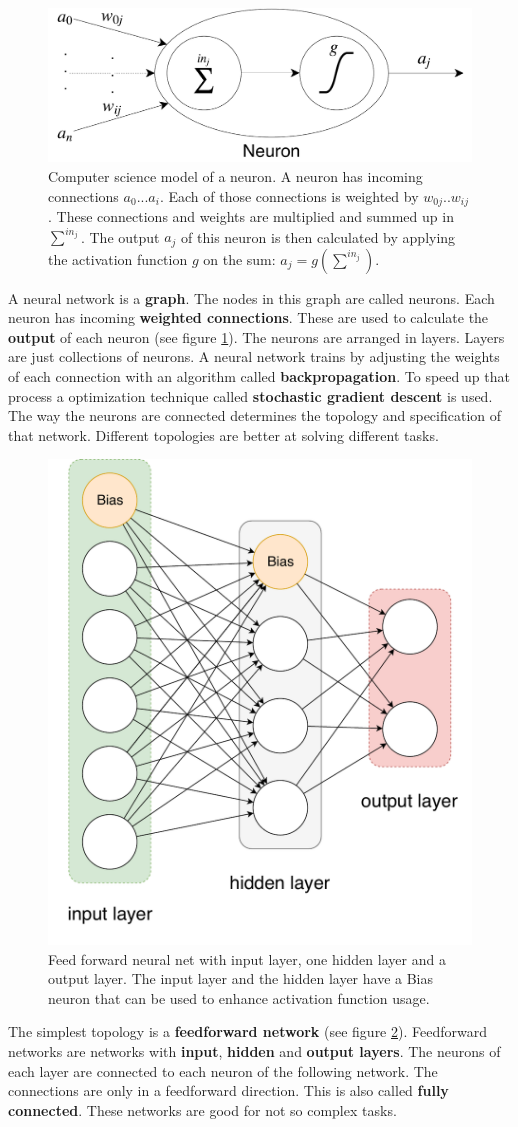 \documentclass[jou,apacite]{apa6}
\begin{document}
\begin{figure}[!htb]
\centering
\includegraphics[width=.3\textwidth]{neuron.pdf}
\caption[Computer science neuron abstraction]{Computer science model of a neuron. A neuron has incoming connections $a_0 ... a_i$. Each of those connections is weighted by $w_{0j} .. w_{ij}$. These connections and weights are multiplied and summed up in $\sum^{in_j}$. The output $a_j$ of this neuron is then calculated by applying the activation function $g$ on the sum: $a_j = g(\sum^{in_j})$.}
\label{fig:neuron}
\end{figure}

A neural network is a \textbf{graph}. The nodes in this graph are called neurons. Each neuron has incoming \textbf{weighted connections}. These are used to calculate the \textbf{output} of each neuron (see figure \ref{fig:neuron}). The neurons are arranged in layers. Layers are just collections of neurons. A neural network trains by adjusting the weights of each connection with an algorithm called \textbf{backpropagation}. To speed up that process a optimization technique called \textbf{stochastic gradient descent} is used. The way the neurons are connected determines the topology and specification of that network. Different topologies are better at solving different tasks.

\begin{figure}[!htb]
\centering
\includegraphics[width=.3\textwidth]{feed-forward-neural-net.pdf}
\caption[Feed forward neural net]{Feed forward neural net with input layer, one hidden layer and a output layer. The input layer and the hidden layer have a Bias neuron that can be used to enhance activation function usage.}
\label{fig:ff}
\end{figure}

The simplest topology is a \textbf{feedforward network} (see figure \ref{fig:ff}). Feedforward networks are networks with \textbf{input}, \textbf{hidden} and \textbf{output layers}. The neurons of each layer are connected to each neuron of the following network. The connections are only in a feedforward direction. This is also called \textbf{fully connected}. These networks are good for not so complex tasks.
\end{document}
